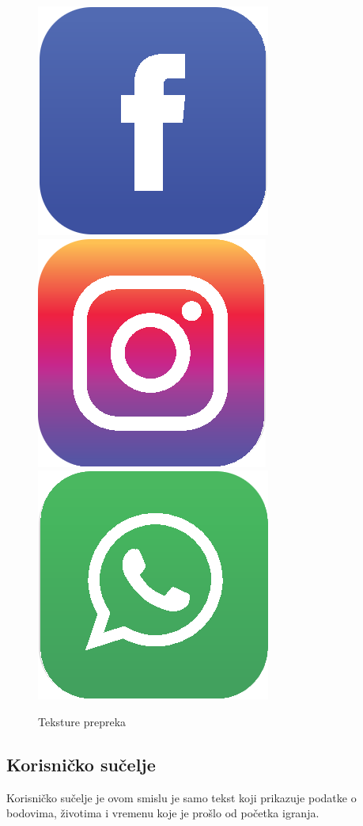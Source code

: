 \documentclass{mathos}
\begin{document}
\begin{figure}[H]
    \centering
    \includegraphics[scale=0.2]{Slike/fb.png}
    \includegraphics[scale=0.2]{Slike/insta.png}
    \includegraphics[scale=0.2]{Slike/whap.png}
    \caption{Teksture prepreka}
    \label{im_prepreke}
\end{figure}

\subsection{Korisničko sučelje}
Korisničko sučelje je ovom smislu je samo tekst koji prikazuje podatke o bodovima, životima i vremenu koje je prošlo od početka igranja.
\end{document}
